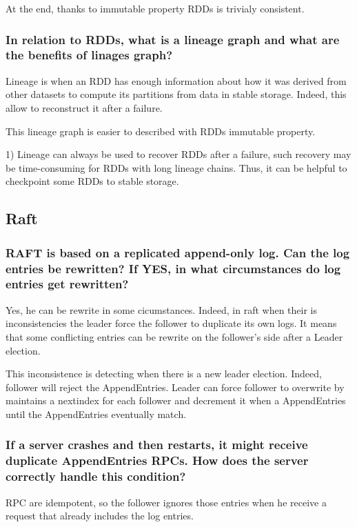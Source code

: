 At the end, thanks to immutable property RDDs is trivialy consistent.

\subsubsection*{In relation to RDDs, what is a lineage graph and what are the benefits of linages graph?}


Lineage is when an RDD has enough information about how it was derived from other datasets to compute its partitions from data in stable storage. Indeed, this allow to reconstruct it after a failure.

This lineage graph is easier to described with RDDs immutable property.

1) Lineage can always be used to recover RDDs after a failure, such recovery may be time-consuming for RDDs with long lineage chains. Thus, it can be helpful to checkpoint some RDDs to stable storage.


\subsection{Raft}

\subsubsection*{RAFT is based on a replicated append-only log. Can the
log entries be rewritten? If YES, in what circumstances do log entries
get rewritten?}

Yes, he can be rewrite in some cicumstances. Indeed, in raft when their is inconsistencies the leader force the follower to duplicate its own logs. It means that some conflicting entries can be rewrite on the follower's side after a Leader election.

This inconsistence is detecting when there is a new leader election. Indeed, follower will reject the AppendEntries. Leader can force follower to overwrite by maintains a nextindex for each follower and decrement it when a AppendEntries until the AppendEntries eventually match.


\subsubsection*{If a server crashes and then restarts, it might receive
duplicate AppendEntries RPCs. How does the server correctly handle this
condition?}

RPC are idempotent, so the follower ignores those entries when he
receive a request that already includes the log entries.



